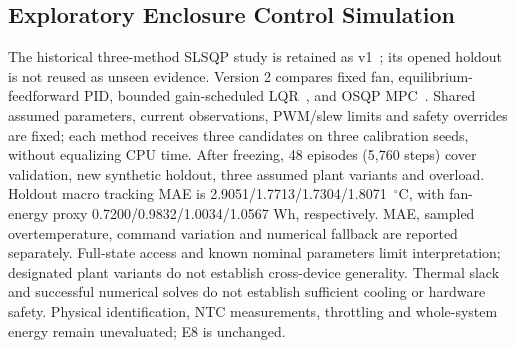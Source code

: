\documentclass[conference,a4paper]{IEEEtran}
\begin{document}
\subsection{Exploratory Enclosure Control Simulation}

The historical three-method SLSQP study is retained as v1~\cite{scipyslsqp}; its opened holdout is not reused as unseen evidence. Version 2 compares fixed fan, equilibrium-feedforward PID, bounded gain-scheduled LQR~\cite{scipydare}, and OSQP MPC~\cite{osqpmpc}. Shared assumed parameters, current observations, PWM/slew limits and safety overrides are fixed; each method receives three candidates on three calibration seeds, without equalizing CPU time. After freezing, 48 episodes (5,760 steps) cover validation, new synthetic holdout, three assumed plant variants and overload. Holdout macro tracking MAE is 2.9051/1.7713/1.7304/1.8071~$^\circ$C, with fan-energy proxy 0.7200/0.9832/1.0034/1.0567 Wh, respectively. MAE, sampled overtemperature, command variation and numerical fallback are reported separately. Full-state access and known nominal parameters limit interpretation; designated plant variants do not establish cross-device generality. Thermal slack and successful numerical solves do not establish sufficient cooling or hardware safety. Physical identification, NTC measurements, throttling and whole-system energy remain unevaluated; E8 is unchanged.
\end{document}
